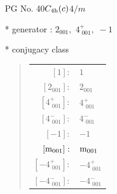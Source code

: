 \documentclass[fleqn,8pt]{jsarticle}
\begin{document}
\setcounter{MaxMatrixCols}{32}

\renewcommand{\tablename}{Table~}
\renewcommand{\figurename}{Figure~}
\begin{center}
\LARGE
PG No. 40\quad$C_{\rm 4h}(c)$\quad$4/m$\quad[ tetragonal ]
\end{center}

* generator : $2{}_{001},\,\,4^{+}_{\,\,001},\,\,-1$

* conjugacy class
\begin{quote}
\begin{tabular}{rl}
$ [1]: $ & $ 1 $ \\
$ [2{}_{001}]: $ & $ 2{}_{001} $ \\
$ [4^{+}_{\,\,001}]: $ & $ 4^{+}_{\,\,001} $ \\
$ [4^{-}_{\,\,001}]: $ & $ 4^{-}_{\,\,001} $ \\
$ [-1]: $ & $ -1 $ \\
$ [{\rm m}_{001}]: $ & $ {\rm m}_{001} $ \\
$ [-4^{+}_{\,\,001}]: $ & $ -4^{+}_{\,\,001} $ \\
$ [-4^{-}_{\,\,001}]: $ & $ -4^{-}_{\,\,001} $
\end{tabular}
\end{quote}
\end{document}
